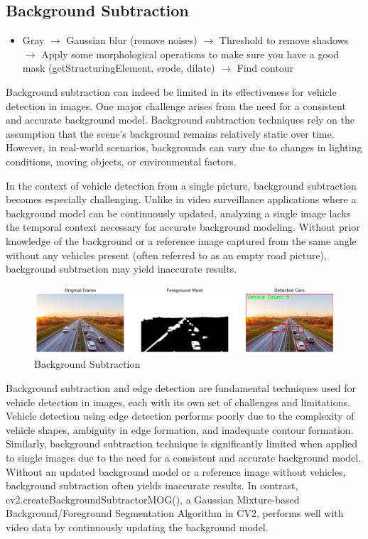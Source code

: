 \documentclass{article}
\begin{document}
\subsection{Background Subtraction}
\begin{itemize}
    \item Gray $\rightarrow$ Gaussian blur (remove noises) $\rightarrow$ Threshold to remove shadows $\rightarrow$ Apply some morphological operations to make sure you have a good mask (getStructuringElement, erode, dilate) $\rightarrow$ Find contour
\end{itemize}
Background subtraction can indeed be limited in its effectiveness for vehicle detection in images. One major challenge arises from the need for a consistent and accurate background model. Background subtraction techniques rely on the assumption that the scene's background remains relatively static over time. However, in real-world scenarios, backgrounds can vary due to changes in lighting conditions, moving objects, or environmental factors.

In the context of vehicle detection from a single picture, background subtraction becomes especially challenging. Unlike in video surveillance applications where a background model can be continuously updated, analyzing a single image lacks the temporal context necessary for accurate background modeling. Without prior knowledge of the background or a reference image captured from the same angle without any vehicles present (often referred to as an empty road picture), background subtraction may yield inaccurate results.
\begin{figure}[H]
    \centering
    \includegraphics[width=1\linewidth]{background_subtraction.png}
    \caption{Background Subtraction}
    \label{fig:enter-label}
\end{figure}
Background subtraction and edge detection are fundamental techniques used for vehicle detection in images, each with its own set of challenges and limitations. Vehicle detection using edge detection performs poorly due to the complexity of vehicle shapes, ambiguity in edge formation, and inadequate contour formation. Similarly, background subtraction technique is significantly limited when applied to single images due to the need for a consistent and accurate background model. Without an updated background model or a reference image without vehicles, background subtraction often yields inaccurate results. In contrast, cv2.createBackgroundSubtractorMOG(), a Gaussian Mixture-based Background/Foreground Segmentation Algorithm in CV2, performs well with video data by continuously updating the background model.
\end{document}
